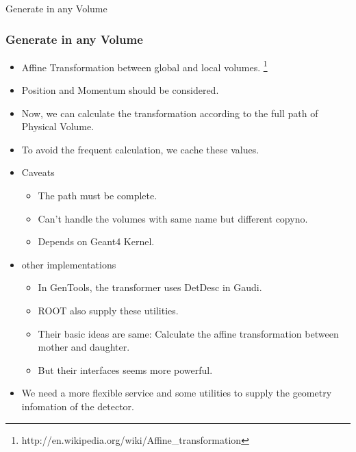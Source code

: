 \begin{frame}
    \begin{center}
        \LARGE Generate in any Volume
    \end{center}
\end{frame}

\begin{frame}
    \frametitle{Generate in any Volume}
    \begin{itemize}
        \item Affine Transformation between global and local volumes.
            \footnote{http://en.wikipedia.org/wiki/Affine\_transformation}
        \item Position and Momentum should be considered.
        \item Now, we can calculate the transformation according to 
              the full path of Physical Volume.
        \item To avoid the frequent calculation, we cache these values.
        \item Caveats
            \begin{itemize}
                \item The path must be complete.
                \item Can't handle the volumes with same name 
                        but different copyno.
                \item Depends on Geant4 Kernel.
            \end{itemize}
        \item other implementations
            \begin{itemize}
                \item In GenTools, the transformer uses DetDesc in Gaudi.
                \item ROOT also supply these utilities.
                \item Their basic ideas are same: Calculate the affine
                    transformation between mother and daughter.
                \item But their interfaces seems more powerful.
            \end{itemize}
        \item We need a more flexible service and some utilities 
            to supply the geometry infomation of the detector.
            
    \end{itemize}
\end{frame}
